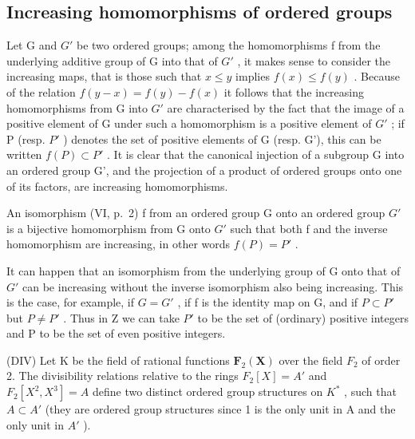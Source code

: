 \subsection{Increasing homomorphisms of ordered groups}

Let G and \(G'\) be two ordered groups; among the homomorphisms f from the underlying additive group of G into that of \(G'\) , it makes sense to consider the increasing maps, that is those such that \(x \leqslant y\) implies \(f(x) \leqslant f(y)\) . Because of the relation \(f(y - x) = f(y) - f(x)\) it follows that the increasing homomorphisms from G into \(G'\) are characterised by the fact that the image of a positive element of G under such a homomorphism is a positive element of \(G'\) ; if P (resp. \(P'\) ) denotes the set of positive elements of G (resp. G'), this can be written \(f(P) \subset P'\) . It is clear that the canonical injection of a subgroup G into an ordered group G', and the projection of a product of ordered groups onto one of its factors, are increasing homomorphisms.

An isomorphism (VI, p.~2) f from an ordered group G onto an ordered group \(G'\) is a bijective homomorphism from G onto \(G'\) such that both f and the inverse homomorphism are increasing, in other words \(f(P) = P'\) .

It can happen that an isomorphism from the underlying group of G onto that of \(G'\) can be increasing without the inverse isomorphism also being increasing. This is the case, for example, if \(G = G'\) , if f is the identity map on G, and if \(P \subset P'\) but \(P \neq P'\) . Thus in Z we can take \(P'\) to be the set of (ordinary) positive integers and P to be the set of even positive integers.

(DIV) Let K be the field of rational functions \(\mathbf{F}_{2}(\mathbf{X})\) over the field \(F_{2}\) of order 2. The divisibility relations relative to the rings \(F_{2}[X] = A'\) and \(F_{2}[X^{2}, X^{3}] = A\) define two distinct ordered group structures on \(K^{*}\) , such that \(A \subset A'\) (they are ordered group structures since 1 is the only unit in A and the only unit in \(A'\) ).

